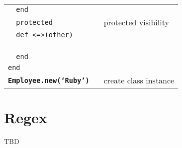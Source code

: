 \documentclass[6pt]{article}
\begin{document}
\begin{multicols}{3}
\begin{tabular}{L{0.55\linewidth} L{0.45\linewidth}}
    \tt ~~end                                                                     \\
    \tt ~~protected                             & protected visibility            \\
    \tt ~~def <=>(other)                                                          \\
    \tt ~~~~                                                       \\
    \tt ~~end                                                                     \\
    \tt end                                                                       \\
    \tt \textbf{Employee.new(`Ruby')}           & create class instance           \\
  \end{tabular}

  \section{Regex}
  TBD

\end{multicols}
\end{document}
